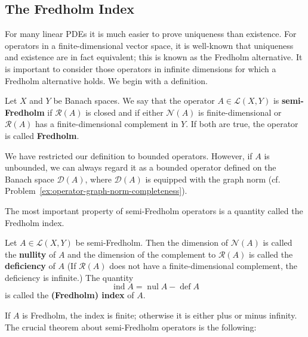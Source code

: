 \subsection{The Fredholm Index}\label{sec:fredholm-index}

For many linear PDEs it is much easier to prove uniqueness than existence. For operators in a finite-dimensional vector space, it is well-known that uniqueness and existence are in fact equivalent; this is known as the Fredholm alternative. It is important to consider those operators in infinite dimensions for which a Fredholm alternative holds. We begin with a definition.

\begin{Definition}
\label{def:semi-fredholm-and-fredholm-operators}
Let $X$ and $Y$ be Banach spaces. We say that the operator $A\in\mathcal{L}(X,Y)$ is \textbf{semi-Fredholm} if $\mathcal{R}(A)$ is closed and if either $\mathcal{N}(A)$ is finite-dimensional or $\mathcal{R}(A)$ has a finite-dimensional complement in $Y$. If both are true, the operator is called \textbf{Fredholm}.
\end{Definition}

We have restricted our definition to bounded operators. However, if $A$ is unbounded, we can always regard it as a bounded operator defined on the Banach space $\mathcal{D}(A)$, where $\mathcal{D}(A)$ is equipped with the graph norm (cf. Problem~\ref{ex:operator-graph-norm-completeness}).

The most important property of semi-Fredholm operators is a quantity called the Fredholm index.

\begin{Definition}
\label{def:fredholm-nullity-deficiency-index}
Let $A\in\mathcal{L}(X,Y)$ be semi-Fredholm. Then the dimension of $\mathcal{N}(A)$ is called the \textbf{nullity} of $A$ and the dimension of the complement to $\mathcal{R}(A)$ is called the \textbf{deficiency} of $A$ (If $\mathcal{R}(A)$ does not have a finite-dimensional complement, the deficiency is infinite.) The quantity
\begin{equation}\label{eq:fredholm-index-nullity-minus-deficiency}
\operatorname{ind}A=\operatorname{nul}A-\operatorname{def}A
\end{equation}
is called the \textbf{(Fredholm) index} of $A$.
\end{Definition}

If $A$ is Fredholm, the index is finite; otherwise it is either plus or minus infinity. The crucial theorem about semi-Fredholm operators is the following:

